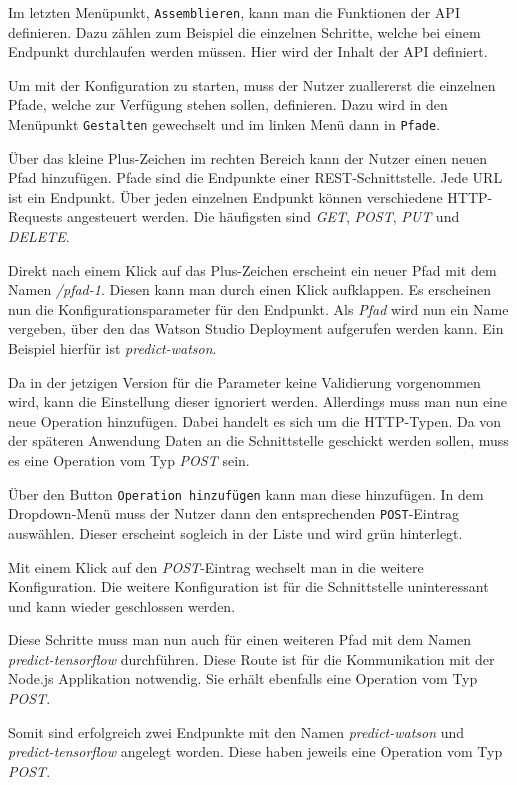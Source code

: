 Im letzten Menüpunkt, \texttt{Assemblieren}, kann man die Funktionen der API definieren. Dazu zählen zum Beispiel die
einzelnen Schritte, welche bei einem Endpunkt durchlaufen werden müssen. Hier wird der Inhalt der API definiert.

Um mit der Konfiguration zu starten, muss der Nutzer zuallererst die einzelnen Pfade, welche zur Verfügung stehen sollen,
definieren. Dazu wird in den Menüpunkt \texttt{Gestalten} gewechselt und im linken Menü dann in \texttt{Pfade}.

Über das kleine Plus-Zeichen im rechten Bereich kann der Nutzer einen neuen Pfad hinzufügen. Pfade sind die Endpunkte
einer REST-Schnittstelle. Jede URL ist ein Endpunkt. Über jeden einzelnen Endpunkt können verschiedene HTTP-Requests
angesteuert werden. Die häufigsten sind \textit{GET}, \textit{POST}, \textit{PUT} und \textit{DELETE}.

Direkt nach einem Klick auf das Plus-Zeichen erscheint ein neuer Pfad mit dem Namen \textit{/pfad-1}. Diesen kann man
durch einen Klick aufklappen. Es erscheinen nun die Konfigurationsparameter für den Endpunkt. Als \textit{Pfad} wird nun
ein Name vergeben, über den das Watson Studio Deployment aufgerufen werden kann. Ein Beispiel hierfür ist
\textit{predict-watson}.

Da in der jetzigen Version für die Parameter keine Validierung vorgenommen wird, kann die Einstellung dieser ignoriert
werden. Allerdings muss man nun eine neue Operation hinzufügen. Dabei handelt es sich um die HTTP-Typen. Da von der
späteren Anwendung Daten an die Schnittstelle geschickt werden sollen, muss es eine Operation vom Typ \textit{POST} sein.

Über den Button \texttt{Operation hinzufügen} kann man diese hinzufügen. In dem Dropdown-Menü muss der Nutzer dann den
entsprechenden \texttt{POST}-Eintrag auswählen. Dieser erscheint sogleich in der Liste und wird grün hinterlegt.

Mit einem Klick auf den \textit{POST}-Eintrag wechselt man in die weitere Konfiguration. Die weitere Konfiguration ist
für die Schnittstelle uninteressant und kann wieder geschlossen werden.

Diese Schritte muss man nun auch für einen weiteren Pfad mit dem Namen \textit{predict-tensorflow} durchführen. Diese
Route ist für die Kommunikation mit der Node.js Applikation notwendig. Sie erhält ebenfalls eine Operation vom Typ
\textit{POST}.

Somit sind erfolgreich zwei Endpunkte mit den Namen \textit{predict-watson} und \textit{predict-tensorflow} angelegt
worden. Diese haben jeweils eine Operation vom Typ \textit{POST}.

